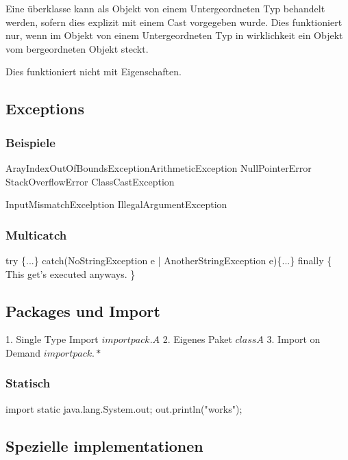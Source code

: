 \begin{multicols}{2}
	Eine überklasse kann als Objekt von einem Untergeordneten Typ behandelt werden, sofern dies explizit mit einem Cast vorgegeben wurde.
	Dies funktioniert nur, wenn im Objekt von einem Untergeordneten Typ in wirklichkeit ein Objekt vom bergeordneten Objekt steckt.

	Dies funktioniert nicht mit Eigenschaften. %


\subsection{Exceptions}

\subsubsection{Beispiele}
	
	\begin{java}	
		ArayIndexOutOfBoundsExceptionArithmeticException
		NullPointerError
		StackOverflowError
		ClassCastException
		
		InputMismatchExcelption
		IllegalArgumentException
	\end{java}
	
	
	\subsubsection{Multicatch}
	
	try \{...\} catch(NoStringException e | AnotherStringException e)\{...\} finally \{ This get's executed anyways. \}

	\subsection{Packages und Import}

	1. Single Type Import $import pack.A$
	2. Eigenes Paket $class A$
	3. Import on Demand $import pack.*$


	\subsubsection{Statisch}
		import static java.lang.System.out;
		out.println("works");

\subsection{Spezielle implementationen}


\end{multicols}
